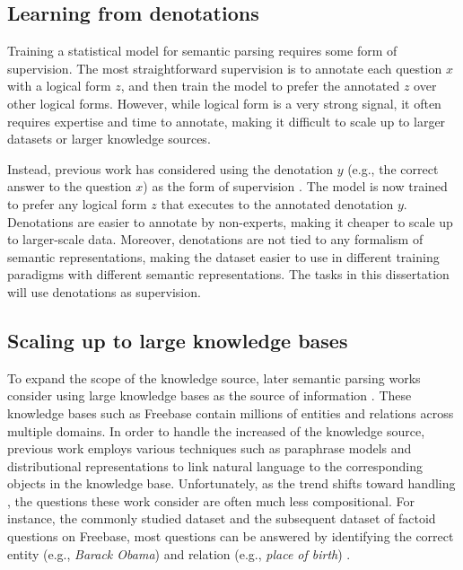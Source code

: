 \subsection{Learning from denotations}
Training a statistical model for semantic parsing
requires some form of supervision.
The most straightforward supervision is to annotate
each question $x$ with a logical form $z$,
and then train the model to prefer the annotated $z$
over other logical forms.
However,
while logical form is a very strong signal,
it often requires expertise and time to annotate,
making it difficult to scale up to larger datasets
or larger knowledge sources.

Instead, previous work has considered using
the denotation $y$ (e.g., the correct answer to the
question $x$) as the form of supervision
\cite{clarke10world,liang11dcs}.
The model is now trained to prefer any logical form $z$
that executes to the annotated denotation $y$.
Denotations are easier to annotate by non-experts,
making it cheaper to scale up to larger-scale data.
Moreover, denotations are not tied to any formalism
of semantic representations,
making the dataset easier to use in different training paradigms
with different semantic representations.
The tasks in this dissertation will use denotations as supervision.

\subsection{Scaling up to large knowledge bases}

To expand the scope of the knowledge source,
later semantic parsing works consider using
large knowledge bases as the source of information
\cite{cai2013large,berant2013freebase}.
These knowledge bases such as
Freebase \cite{freebase2013dump} contain
millions of entities and relations
across multiple domains.
In order to handle the increased \Breadth
of the knowledge source,
previous work employs various techniques such as
paraphrase models \cite{berant2014paraphrasing}
and distributional representations \cite{bordes2015simple}
to link natural language to the corresponding
objects in the knowledge base.
Unfortunately,
as the trend shifts toward handling \Breadth,
the questions these work consider are often
much less compositional.
For instance, the commonly studied
 dataset \cite{berant2013freebase}
and the subsequent  dataset
\cite{bordes2015simple}
of factoid questions on Freebase,
most questions can be answered by identifying the correct
entity (e.g., \emph{Barack Obama})
and relation (e.g., \emph{place of birth})
\cite{yao2014freebase}.

